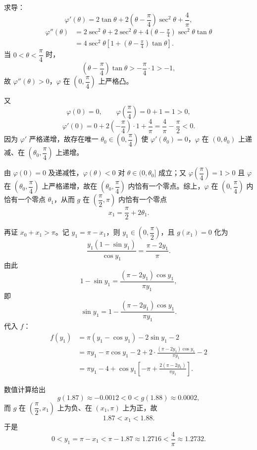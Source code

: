 \begin{answer}
求导：
\nopagebreak[4]
\[\varphi'(\theta)=2\tan\theta+2\left(\theta-\frac\pi4\right)\sec^2\theta+\frac4\pi,\]
\nopagebreak[4]
\[\begin{aligned}
\varphi''(\theta)&=2\sec^2\theta+2\sec^2\theta+4\left(\theta-\frac\pi4\right)\sec^2\theta\tan\theta\\
&=4\sec^2\theta\left[1+\left(\theta-\frac\pi4\right)\tan\theta\right].
\end{aligned}\]
当 $0<\theta<\dfrac\pi4$ 时，
\nopagebreak[4]
\[\left(\theta-\frac\pi4\right)\tan\theta>-\frac\pi4\cdot1>-1,\]
故 $\varphi''(\theta)>0$，$\varphi$ 在 $\left(0,\dfrac\pi4\right)$ 上严格凸。

又
\nopagebreak[4]
\[\varphi(0)=0,\qquad \varphi\left(\frac\pi4\right)=0+1=1>0,\]
\nopagebreak[4]
\[\varphi'(0)=0+2\left(-\frac\pi4\right)\cdot1+\frac4\pi=\frac4\pi-\frac\pi2<0.\]
因为 $\varphi'$ 严格递增，故存在唯一 $\theta_0\in\left(0,\dfrac\pi4\right)$ 使 $\varphi'(\theta_0)=0$，$\varphi$ 在 $(0,\theta_0)$ 上递减、在 $\left(\theta_0,\dfrac\pi4\right)$ 上递增。

由 $\varphi(0)=0$ 及递减性，$\varphi(\theta)<0$ 对 $\theta\in(0,\theta_0]$ 成立；又 $\varphi\left(\dfrac\pi4\right)=1>0$ 且 $\varphi$ 在 $\left(\theta_0,\dfrac\pi4\right)$ 上严格递增，故在 $\left(\theta_0,\dfrac\pi4\right)$ 内恰有一个零点。综上，$\varphi$ 在 $\left(0,\dfrac\pi4\right)$ 内恰有一个零点 $\theta_1$，从而 $g$ 在 $\left(\dfrac\pi2,\pi\right)$ 内恰有一个零点
\nopagebreak[4]
\[x_1=\frac\pi2+2\theta_1.\]

再证 $x_0+x_1>\pi$。记 $y_1=\pi-x_1$，则 $y_1\in\left(0,\dfrac\pi2\right)$，且 $g(x_1)=0$ 化为
\nopagebreak[4]
\[\frac{y_1(1-\sin y_1)}{\cos y_1}=\frac{\pi-2y_1}{\pi}.\]
由此
\nopagebreak[4]
\[1-\sin y_1=\frac{(\pi-2y_1)\cos y_1}{\pi y_1},\]
即
\nopagebreak[4]
\[\sin y_1=1-\frac{(\pi-2y_1)\cos y_1}{\pi y_1}.\]
代入 $f$：
\nopagebreak[4]
\[\begin{aligned}
f(y_1)&=\pi(y_1-\cos y_1)-2\sin y_1-2\\
&=\pi y_1-\pi\cos y_1-2+2\cdot\frac{(\pi-2y_1)\cos y_1}{\pi y_1}-2\\
&=\pi y_1-4+\cos y_1\left[-\pi+\frac{2(\pi-2y_1)}{\pi y_1}\right].
\end{aligned}\]

数值计算给出
\nopagebreak[4]
\[g(1.87)\approx-0.0012<0<g(1.88)\approx0.0002,\]
而 $g$ 在 $\left(\dfrac\pi2,x_1\right)$ 上为负、在 $(x_1,\pi)$ 上为正，故
\nopagebreak[4]
\[1.87<x_1<1.88.\]
于是
\nopagebreak[4]
\[0<y_1=\pi-x_1<\pi-1.87\approx1.2716<\frac4\pi\approx1.2732.\]


\end{answer}
